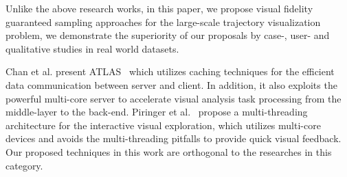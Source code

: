 Unlike the above research works, in this paper, we propose visual fidelity guaranteed sampling approaches for the large-scale trajectory visualization problem,
we demonstrate the superiority of our proposals by case-, user- and qualitative studies in real world datasets.


Chan et al. present ATLAS~\cite{chan2008maintaining} which utilizes caching techniques for the efficient data communication between server and client.
In addition, it also exploits the powerful multi-core server to accelerate visual analysis task processing from the middle-layer to the back-end.
Piringer et al.~\cite{piringer2009multi} propose a multi-threading architecture for the interactive visual exploration,
which utilizes multi-core devices and avoids the multi-threading pitfalls to provide quick visual feedback.
{Our} proposed techniques in this work are orthogonal to the researches in this category.



